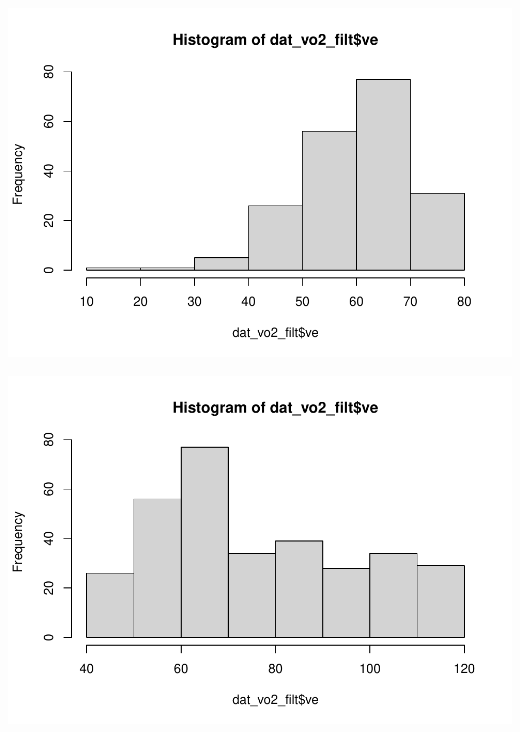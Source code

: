 \documentclass[
]{book}
\newenvironment{Shaded}{\begin{snugshade}}{\end{snugshade}}
\newcommand{\CommentTok}[1]{\textcolor[rgb]{0.56,0.35,0.01}{\textit{#1}}}
\newcommand{\DecValTok}[1]{\textcolor[rgb]{0.00,0.00,0.81}{#1}}
\newcommand{\FunctionTok}[1]{\textcolor[rgb]{0.00,0.00,0.00}{#1}}
\newcommand{\NormalTok}[1]{#1}
\newcommand{\OtherTok}[1]{\textcolor[rgb]{0.56,0.35,0.01}{#1}}
\newcommand{\SpecialCharTok}[1]{\textcolor[rgb]{0.00,0.00,0.00}{#1}}
\begin{document}
\includegraphics{se201_stats_book_files/figure-latex/unnamed-chunk-112-1.pdf}

\begin{Shaded}
\end{Shaded}

\includegraphics{se201_stats_book_files/figure-latex/unnamed-chunk-112-2.pdf}
\end{document}
